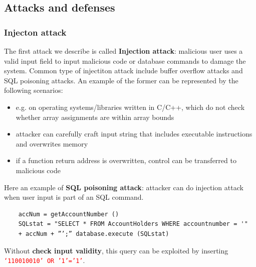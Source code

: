 \documentclass[10pt,a4paper]{report}
\begin{document}
\subsection{Attacks and defenses}
\subsubsection{Injecton attack}
The first attack we describe is called \textbf{Injection attack}: malicious user uses a valid input field to input malicious code or database commands to damage the system. Common type of injectiton attack include buffer overflow attacks and SQL poisoning attacks. An example of the former can be represented by the following scenarios:
\begin{itemize}
	\item e.g. on operating systems/libraries written in C/C++, which do not check whether
	array assignments are within array bounds
	\item attacker can carefully craft input string that includes executable instructions and overwrites memory
	\item  if a function return address is overwritten, control can be transferred to malicious code
\end{itemize}
Here an example of \textbf{SQL poisoning attack}: attacker can do injection attack when user input is part of an SQL command.
\begin{verbatim}
	accNum = getAccountNumber ()
	SQLstat = "SELECT * FROM AccountHolders WHERE accountnumber = '"
	+ accNum + ”’;” database.execute (SQLstat)
\end{verbatim}
Without \textbf{check input validity}, this query can be exploited by inserting \textcolor{red}{\texttt{‘110010010’ OR '1'='1'}}.
\end{document}
